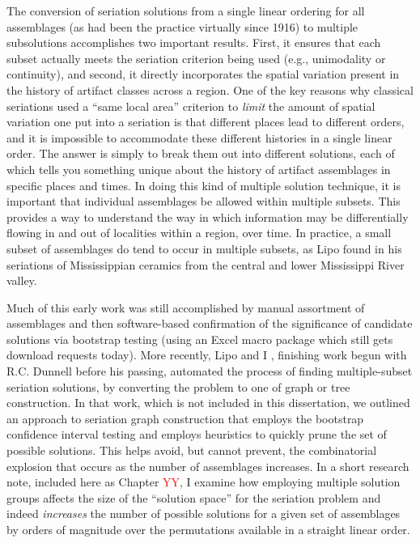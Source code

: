 The conversion of seriation solutions from a single linear ordering for all assemblages (as had been the practice virtually since 1916) to multiple subsolutions accomplishes two important results.  First, it ensures that each subset actually meets the seriation criterion being used (e.g., unimodality or continuity), and second, it directly incorporates the spatial variation present in the history of artifact classes across a region.  One of the key reasons why classical seriations used a ``same local area'' criterion to \emph{limit} the amount of spatial variation one put into a seriation is that different places lead to different orders, and it is impossible to accommodate these different histories in a single linear order.  The answer is simply to break them out into different solutions, each of which tells you something unique about the history of artifact assemblages in specific places and times.  In doing this kind of multiple solution technique, it is important that individual assemblages be allowed within multiple subsets.  This provides a way to understand the way in which information may be differentially flowing in and out of localities within a region, over time.  In practice, a small subset of assemblages do tend to occur in multiple subsets, as Lipo found in his seriations of Mississippian ceramics from the central and lower Mississippi River valley.  

Much of this early work was still accomplished by manual assortment of assemblages and then software-based confirmation of the significance of candidate solutions via bootstrap testing (using an Excel macro package which still gets download requests today).  More recently, Lipo and I \citeyearpar{Lipo2015}, finishing work begun with R.C. Dunnell before his passing, automated the process of finding multiple-subset seriation solutions, by converting the problem to one of graph or tree construction.  In that work, which is not included in this dissertation, we outlined an approach to seriation graph construction that employs the bootstrap confidence interval testing and employs heuristics to quickly prune the set of possible solutions.  This helps avoid, but cannot prevent, the combinatorial explosion that occurs as the number of assemblages increases.  In a short research note, included here as Chapter \textcolor{red}{YY}, I examine how employing multiple solution groups affects the size of the ``solution space'' for the seriation problem and indeed \emph{increases} the number of possible solutions for a given set of assemblages by orders of magnitude over the permutations available in a straight linear order.

